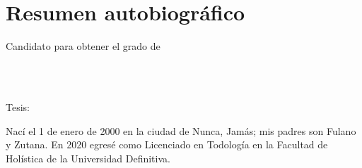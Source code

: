 
\chapter*{Resumen autobiográfico}
\thispagestyle{empty}

\begin{center}
\autor

Candidato para obtener el grado de\\
\grado\\
\orientacion\bigskip

\uanl\\
\fime\bigskip

Tesis:\\
\textsc{\large\titulo}
\end{center}\bigskip

Nací el 1 de enero de 2000 en la ciudad de Nunca, Jamás; mis padres son Fulano y Zutana. En 2020 egresé como Licenciado en Todología en la Facultad de Holística de la Universidad Definitiva.
